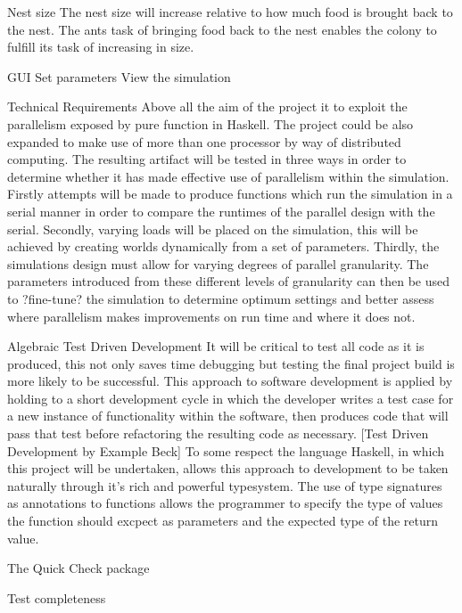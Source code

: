 \documentclass[main.tex]{subfiles}
\begin{document}
Nest size
The nest size will increase relative to how much food is brought back to the nest. The ants task of bringing food back to the nest enables the colony to fulfill its task of increasing in size.

GUI
Set parameters
View the simulation


Technical Requirements
Above all the aim of the project it to exploit the parallelism exposed by pure function in Haskell. The project could be also expanded to make use of more than one processor by way of distributed computing. The resulting artifact will be tested in three ways in order to determine whether it has made effective use of parallelism within the simulation. Firstly attempts will be made to produce functions which run the simulation in a serial manner in order to compare the runtimes of the parallel design with the serial. Secondly, varying loads will be placed on the simulation, this will be achieved by creating worlds dynamically from a set of parameters. Thirdly, the simulations design must allow for varying degrees of parallel granularity. The parameters introduced from these different levels of granularity can then be used to ?fine-tune? the simulation to determine optimum settings and better assess where parallelism makes improvements on run time and where it does not.



Algebraic Test Driven Development
It will be critical to test all code as it is produced, this not only saves time debugging but testing the final project build is more likely to be successful. This approach to software development is applied by holding to a short development cycle in which the developer writes a test case for a new instance of functionality within the software, then produces code that will pass that test before refactoring the resulting code as necessary. [Test Driven Development by Example Beck] To some respect the language Haskell, in which this project will be undertaken, allows this approach to development to be taken naturally through it's rich and powerful typesystem. The use of type signatures as annotations to functions allows the programmer to specify the type of values the function should excpect as parameters and the expected type of the return value.

The Quick Check package

Test completeness
\end{document}
